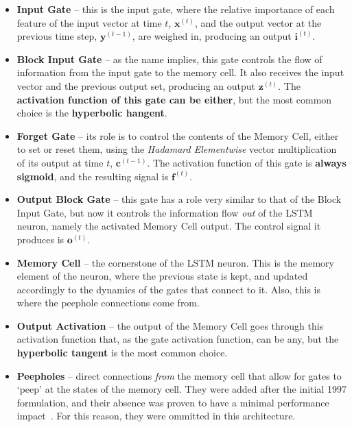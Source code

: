 \documentclass{IEEEtran}
\newcommand{\mb}[1]{\mathbf{#1}}
\begin{document}
\begin{itemize}
    \item \textbf{Input Gate} -- this is the input gate, where the relative importance of each feature of
the input vector at time $t$, $\mb{x}^{(t)}$, and the output vector at the previous time step, $\mb{y}^{(t-1)}$,
are weighed in, producing an output $\mb{i}^{(t)}$.

    \item \textbf{Block Input Gate} -- as the name implies, this gate controls the flow of information
from the input gate to the memory cell. It also receives the input vector and the previous output
set, producing an output $\mb{z}^{(t)}$. The \textbf{activation function of this gate can be either},
but the most common choice is the \textbf{hyperbolic hangent}.

    \item \textbf{Forget Gate} -- its role is to control the contents of the Memory Cell, either to
set or reset them, using the \textit{Hadamard Elementwise} vector multiplication of its output at time
$t$, $\mb{c}^{(t-1)}$. The activation function of this gate is \textbf{always sigmoid}, and the resulting
signal is $\mb{f}^{(t)}$.

    \item \textbf{Output Block Gate} -- this gate has a role very similar to that of the Block Input
Gate, but now it controls the information flow \textit{out} of the LSTM neuron, namely the activated
Memory Cell output. The control signal it produces is $\mb{o}^{(t)}$.

    \item \textbf{Memory Cell} -- the cornerstone of the LSTM neuron. This is the memory element of
the neuron, where the previous state is kept, and updated accordingly to the dynamics of the gates
that connect to it. Also, this is where the peephole connections come from.

    \item \textbf{Output Activation} -- the output of the Memory Cell goes through this activation
function that, as the gate activation function, can be any, but the \textbf{hyperbolic tangent}
is the most common choice.

    \item \textbf{Peepholes} -- direct connections \textit{from} the memory cell that allow for gates
to `peep' at the states of the memory cell. They were added after the initial 1997 formulation, and their
absence was proven to have a minimal performance impact~\cite{Greff15}. For this reason, they were ommitted
in this architecture.

\end{itemize}
\end{document}
